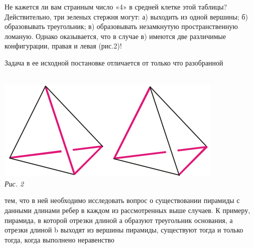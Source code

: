 {\begin{multicols}{3}
Не кажется ли вам странным число «4» в средней клетке этой таблицы?
Действительно, три зеленых стержня могут: а) выходить из одной вершины;
б) образовывать треугольник; в) образовывать незамкнутую
пространственную ломаную. Однако оказывается, что в случае
в) имеются две различимые конфигурации, правая и левая (рис.2)! \par
Задача в ее исходной постановке отличается от только что разобранной \\ \\
\begin{minipage}{\linewidth}
\includegraphics[width=\linewidth]{images/picture2.png} \\
\textsl{Рис. 2} \\
\end{minipage}
тем, что в ней необходимо исследовать вопрос о существовании
пирамиды с данными длинами ребер в каждом из рассмотренных
выше случаев. К примеру, пирамида, в которой отрезки длиной
$а$ образуют треугольник основания, а отрезки длиной b выходят из
вершины пирамиды, существуют тогда и только тогда, когда
выполнено неравенство\\ 


\end{multicols}}
